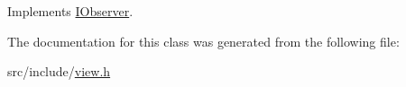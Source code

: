 Implements \hyperlink{class_i_observer_a91a4770cbec97439f2faba69a1ed72e0}{I\-Observer}.



The documentation for this class was generated from the following file\-:\begin{DoxyCompactItemize}
\item 
src/include/\hyperlink{view_8h}{view.\-h}\end{DoxyCompactItemize}
